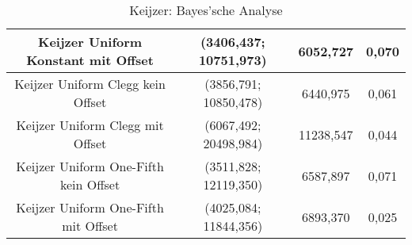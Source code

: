 \begin{table}[H]
\begin{tabular}{c | c | c | c}
		\hline
		Keijzer Uniform Konstant mit Offset & (3406,437; 10751,973) & \color{Green}6052,727\color{black} & \color{Green}0,070\color{black}\\
		\hline
		Keijzer Uniform Clegg kein Offset & (3856,791; 10850,478) & 6440,975 & 0,061\\
		\hline
		Keijzer Uniform Clegg mit Offset & \color{red}(6067,492; 20498,984)\color{black} & \color{red}11238,547\color{black} & \color{red}0,044\color{black}\\
		\hline
		Keijzer Uniform One-Fifth kein Offset & (3511,828; 12119,350) & 6587,897 & \color{Green}0,071\color{black}\\
		\hline
		Keijzer Uniform One-Fifth mit Offset & (4025,084; 11844,356) & 6893,370 & \color{red}0,025\color{black}\\
	\end{tabular}
	\caption{Keijzer: Bayes'sche Analyse}
	\label{table:keijzerBayesian}
\end{table} 

